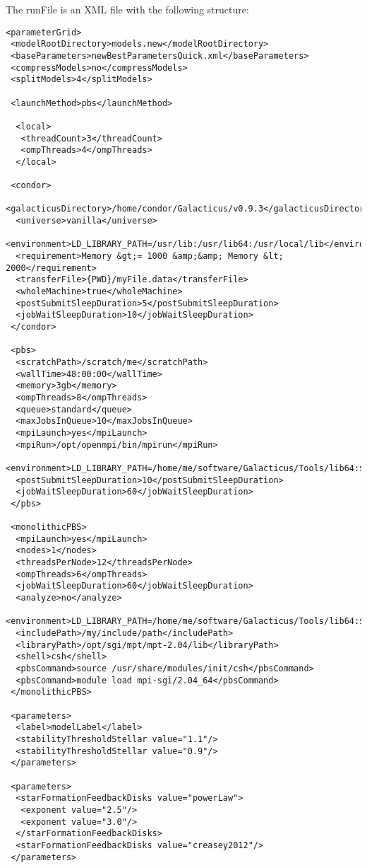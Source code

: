 The {\normalfont \ttfamily runFile} is an XML file with the following structure:
\begin{verbatim}
<parameterGrid>
 <modelRootDirectory>models.new</modelRootDirectory>
 <baseParameters>newBestParametersQuick.xml</baseParameters>
 <compressModels>no</compressModels>
 <splitModels>4</splitModels>

 <launchMethod>pbs</launchMethod>

  <local>
   <threadCount>3</threadCount>
   <ompThreads>4</ompThreads>
  </local>

 <condor>
  <galacticusDirectory>/home/condor/Galacticus/v0.9.3</galacticusDirectory>
  <universe>vanilla</universe>
  <environment>LD_LIBRARY_PATH=/usr/lib:/usr/lib64:/usr/local/lib</environment>
  <requirement>Memory &gt;= 1000 &amp;&amp; Memory &lt; 2000</requirement>
  <transferFile>{PWD}/myFile.data</transferFile>
  <wholeMachine>true</wholeMachine>
  <postSubmitSleepDuration>5</postSubmitSleepDuration>
  <jobWaitSleepDuration>10</jobWaitSleepDuration>
 </condor>

 <pbs>
  <scratchPath>/scratch/me</scratchPath>
  <wallTime>48:00:00</wallTime>
  <memory>3gb</memory>
  <ompThreads>8</ompThreads>
  <queue>standard</queue>
  <maxJobsInQueue>10</maxJobsInQueue>
  <mpiLaunch>yes</mpiLaunch>
  <mpiRun>/opt/openmpi/bin/mpirun</mpiRun>
  <environment>LD_LIBRARY_PATH=/home/me/software/Galacticus/Tools/lib64:$LD_LIBRARY_PATH</environment>
  <postSubmitSleepDuration>10</postSubmitSleepDuration>
  <jobWaitSleepDuration>60</jobWaitSleepDuration>
 </pbs>

 <monolithicPBS>
  <mpiLaunch>yes</mpiLaunch>
  <nodes>1</nodes>
  <threadsPerNode>12</threadsPerNode>
  <ompThreads>6</ompThreads>
  <jobWaitSleepDuration>60</jobWaitSleepDuration>
  <analyze>no</analyze>
  <environment>LD_LIBRARY_PATH=/home/me/software/Galacticus/Tools/lib64:$LD_LIBRARY_PATH</environment>
  <includePath>/my/include/path</includePath>
  <libraryPath>/opt/sgi/mpt/mpt-2.04/lib</libraryPath>
  <shell>csh</shell>
  <pbsCommand>source /usr/share/modules/init/csh</pbsCommand>
  <pbsCommand>module load mpi-sgi/2.04_64</pbsCommand>
 </monolithicPBS>
                  
 <parameters>
  <label>modelLabel</label>
  <stabilityThresholdStellar value="1.1"/>
  <stabilityThresholdStellar value="0.9"/>
 </parameters>

 <parameters>
  <starFormationFeedbackDisks value="powerLaw">
   <exponent value="2.5"/>
   <exponent value="3.0"/>
  </starFormationFeedbackDisks>
  <starFormationFeedbackDisks value="creasey2012"/>
 </parameters>


\end{verbatim}
